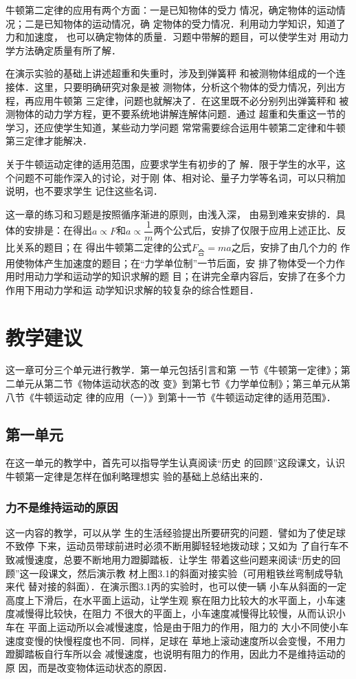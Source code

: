 牛顿第二定律的应用有两个方面：一是已知物体的受力
情况，确定物体的运动情况；二是已知物体的运动情况，确
定物体的受力情况．利用动力学知识，知道了力和加速度，
也可以确定物体的质量．习题中带解的题目，可以使学生对
用动力学方法确定质量有所了解．

在演示实验的基础上讲述超重和失重时，涉及到弹簧秤
和被测物体组成的一个连接体．这里，只要明确研究对象是被
测物体，分析这个物体的受力情况，列出方程，再应用牛顿第
三定律，问题也就解决了．在这里既不必分别列出弹簧秤和
被测物体的动力学方程，更不要系统地讲解连解体问题．通过
超重和失重这一节的学习，还应使学生知道，某些动力学问题
常常需要综合运用牛顿第二定律和牛顿第三定律才能解决．

关于牛顿运动定律的适用范围，应要求学生有初步的了
解．限于学生的水平，这个问题不可能作深入的讨论，对于刚
体、相对论、量子力学等名词，可以只稍加说明，也不要求学生
记住这些名词．

这一章的练习和习题是按照循序渐进的原则，由浅入深，
由易到难来安排的．具体的安排是：在得出$a\propto F$和$a\propto \dfrac{1}{m}$两个公式后，安排了仅限于应用上述正比、反比关系的题目；在
得出牛顿第二定律的公式$F_{\text{合}}=ma$之后，安排了由几个力的
作用使物体产生加速度的题目；在“力学单位制”一节后面，安
排了物体受一个力作用时用动力学和运动学的知识求解的题
目；在讲完全章内容后，安排了在多个力作用下用动力学和运
动学知识求解的较复杂的综合性题目．

\section{教学建议}
这一章可分三个单元进行教学．第一单元包括引言和第
一节《牛顿第一定律》；第二单元从第二节《物体运动状态的改
变》到第七节《力学单位制》；第三单元从第八节《牛顿运动定
律的应用（一）》到第十一节《牛顿运动定律的适用范围》．

\subsection{第一单元}
在这一单元的教学中，首先可以指导学生认真阅读“历史
的回顾”这段课文，认识牛顿第一定律是怎样在伽利略理想实
验的基础上总结出来的．

\subsubsection{力不是维持运动的原因}

这一内容的教学，可以从学
生的生活经验提出所要研究的问题．譬如为了使足球不致停
下来，运动员带球前进时必须不断用脚轻轻地拨动球；又如为
了自行车不致减慢速度，总要不断地用力蹬脚踏板．让学生
带着这些问题来阅读“历史的回顾”这一段课文，然后演示教
材上图3.1的斜面对接实验（可用粗铁丝弯制成导轨来代
替对接的斜面）．在演示图3.1丙的实验时，也可以使一辆
小车从斜面的一定高度上下滑后，在水平面上运动，让学生观
察在阻力比较大的水平面上，小车速度减慢得比较快，在阻力
不很大的平面上，小车速度减慢得比较慢，从而认识小车在
平面上运动所以会减慢速度，恰是由于阻力的作用，阻力的
大小不同使小车速度变慢的快慢程度也不同．同样，足球在
草地上滚动速度所以会变慢，不用力蹬脚踏板自行车所以会
减慢速度，也说明有阻力的作用，因此力不是维持运动的原
因，而是改变物体运动状态的原因．

